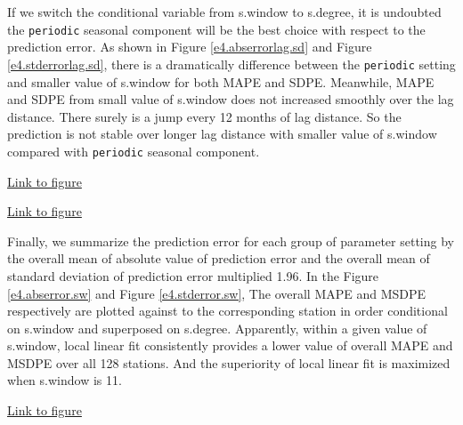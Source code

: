 If we switch the conditional 
variable from s.window to s.degree, it is undoubted the \texttt{periodic} seasonal
component will be the best choice with respect to the prediction error. As shown
in Figure \href{../plots/a1950/E4/tmax.absmeans.vs.lag.sd.pdf}
{\ref*{e4.abserrorlag.sd}} and Figure 
\href{../plots/a1950/E4/tmax.std.vs.lag.sd.pdf}{\ref*{e4.stderrorlag.sd}}, there
is a dramatically difference between the \texttt{periodic} setting and smaller 
value of s.window for both MAPE and SDPE. Meanwhile, MAPE and SDPE from small 
value of s.window does not increased smoothly over the lag distance. There 
surely is a jump every 12 months of lag distance. So the prediction is not stable
over longer lag distance with smaller value of s.window compared with 
\texttt{periodic} seasonal component.

\begin{framed}
\begin{center}
  \href{../plots/a1950/E4/tmax.absmeans.vs.lag.sd.pdf}{Link to figure}
  \label{e4.abserrorlag.sd}
\end{center}
\end{framed}

\begin{framed}
\begin{center}
  \href{../plots/a1950/E4/tmax.std.vs.lag.sd.pdf}{Link to figure}
  \label{e4.stderrorlag.sd}
\end{center}
\end{framed}

Finally, we summarize the prediction error for each group of parameter setting
by the overall mean of absolute value of prediction error and the overall mean
of standard deviation of prediction error multiplied 1.96. In the Figure 
\href{../plots/a1950/E4/tmax.mean.absmeans.error.sw.pdf}{\ref*{e4.abserror.sw}}
and Figure \href{../plots/a1950/E4/tmax.mean.std.error.sw.pdf}
{\ref*{e4.stderror.sw}}, The overall MAPE and MSDPE respectively are plotted 
against to the corresponding station in order conditional on s.window and 
superposed on s.degree. Apparently, within a given value of s.window, local linear
fit consistently provides a lower value of overall MAPE and MSDPE over all 128 
stations. And the superiority of local linear fit is maximized when s.window is
11.

\begin{framed}
\begin{center}
  \href{../plots/a1950/E4/tmax.mean.absmeans.error.sw.pdf}{Link to figure}
  \label{e4.abserror.sw}
\end{center}
\end{framed}

